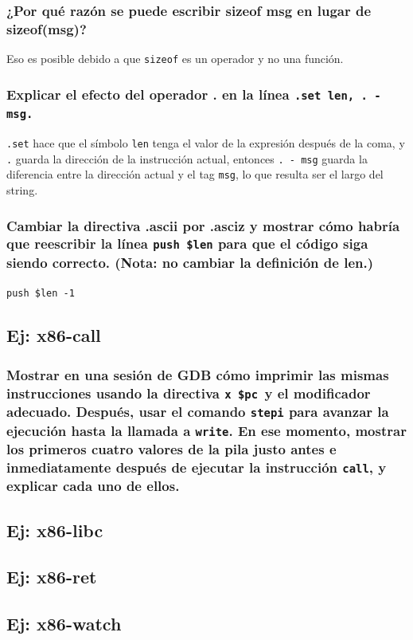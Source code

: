 \documentclass[a4paper]{article}
\newcommand{\code}[1]{\colorbox{light-gray}{\texttt{#1}}}
\begin{document}
    \subsubsection{¿Por qué razón se puede escribir sizeof msg en lugar de sizeof(msg)?}
        Eso es posible debido a que \code{sizeof} es un operador y no una función.
    \subsubsection{Explicar el efecto del operador . en la línea \code{.set len, . - msg.}}
        \code{.set} hace que el símbolo \code{len} tenga el valor de la expresión después de la coma, y \code{.} guarda la dirección de la instrucción actual, entonces \code{. - msg} guarda la diferencia entre la dirección actual y el tag \code{msg}, lo que resulta ser el largo del string.
    \subsubsection{Cambiar la directiva .ascii por .asciz y mostrar cómo habría que reescribir la línea \code{push \$len} para que el código siga siendo correcto. (Nota: no cambiar la definición de len.)}
        \code{push \$len -1}
\subsection{Ej: x86-call}
    \subsubsection{Mostrar en una sesión de GDB cómo imprimir las mismas instrucciones usando la directiva \code{x \$pc }y el modificador adecuado. Después, usar el comando \code{stepi} para avanzar la ejecución hasta la llamada a \code{write}. En ese momento, mostrar los primeros cuatro valores de la pila justo antes e inmediatamente después de ejecutar la instrucción \code{call}, y explicar cada uno de ellos.}
        

\subsection{Ej: x86-libc}
\subsection{Ej: x86-ret}
\subsection{Ej: x86-watch}
\end{document}
